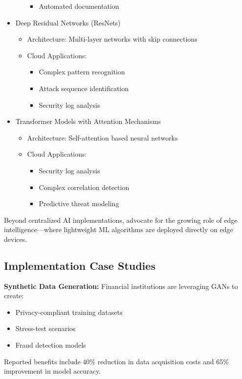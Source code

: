 \documentclass[a4paper,12pt]{article}
\begin{document}
\begin{itemize}
\begin{itemize}
\begin{itemize}
                        \item Automated documentation
                    \end{itemize}
          \end{itemize}
    \item Deep Residual Networks (ResNets)
          \begin{itemize}
              \item Architecture: Multi-layer networks with skip connections
              \item Cloud Applications:
                    \begin{itemize}
                        \item Complex pattern recognition
                        \item Attack sequence identification
                        \item Security log analysis
                    \end{itemize}
          \end{itemize}
    \item Transformer Models with Attention Mechanisms
          \begin{itemize}
              \item Architecture: Self-attention based neural networks
              \item Cloud Applications:
                    \begin{itemize}
                        \item Security log analysis
                        \item Complex correlation detection
                        \item Predictive threat modeling
                    \end{itemize}
          \end{itemize}
\end{itemize}

Beyond centralized AI implementations, \citet{hoffpauir2023survey} advocate for the growing role of edge intelligence—where lightweight ML algorithms are deployed directly on edge devices.

\subsection{Implementation Case Studies}
\textbf{Synthetic Data Generation:} Financial institutions are leveraging GANs to create:
\begin{itemize}
    \item Privacy-compliant training datasets
    \item Stress-test scenarios
    \item Fraud detection models
\end{itemize}
Reported benefits include 40\% reduction in data acquisition costs and 65\% improvement in model accuracy.
\end{document}
